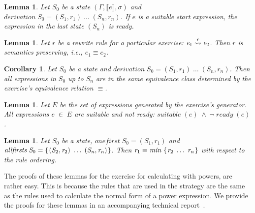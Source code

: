 \documentclass[copyright]{eptcs}
\newcommand{\Conid}[1]{\mathit{#1}}
\newcommand{\Varid}[1]{\mathit{#1}}
\newtheorem{lemma}[thm]{Lemma}
\newtheorem{corollary}[thm]{Corollary}
\begin{document}
\begin{lemma}
  Let \ensuremath{\Conid{S}_{0}} be a state \ensuremath{(\Gamma,{\llbracket\Varid{e}\rrbracket},\sigma)} and \ensuremath{\Varid{derivation}\;\Conid{S}_{0}\mathrel{=}(\Conid{S}_{1},\Varid{r}_{1})\;\ldots\;(\mathit{S_n},\mathit{r_n})}. If \ensuremath{\Varid{e}} is a suitable start expression, the expression in the last
  state \ensuremath{(\mathit{S_n})} is ready.
\end{lemma}
\begin{lemma}
  Let \ensuremath{\Varid{r}} be a rewrite rule for a particular exercise: \ensuremath{\Varid{e}_{1}\;{\buildrel \Varid{r} \over \leadsto}\;\Varid{e}_{2}}. Then \ensuremath{\Varid{r}} 
  is semantics preserving, i.e., \ensuremath{\Varid{e}_{1}\equiv \Varid{e}_{2}}.
\end{lemma}
\begin{corollary}
  Let \ensuremath{\Conid{S}_{0}} be a state and \ensuremath{\Varid{derivation}\;\Conid{S}_{0}\mathrel{=}(\Conid{S}_{1},\Varid{r}_{1})\;\ldots\;(\mathit{S_n},\mathit{r_n})}.  Then all
  expressions in \ensuremath{\Conid{S}_{0}} up to \ensuremath{\mathit{S_n}} are in the same equivalence class determined by
  the exercise's equivalence relation \ensuremath{\equiv }.
\end{corollary}
\begin{lemma}
  Let \ensuremath{\Conid{E}} be the set of expressions generated by the exercise's generator. 
  All expressions \ensuremath{\Varid{e}\;\mathrel{\in}\;\Conid{E}} are suitable and not ready: \ensuremath{\Varid{suitable}\;(\Varid{e})\;\wedge\;\neg\;\Varid{ready}\;(\Varid{e})}.
\end{lemma}
\begin{lemma}
  Let \ensuremath{\Conid{S}_{0}} be a state, \ensuremath{\Varid{onefirst}\;\Conid{S}_{0}\mathrel{=}(\Conid{S}_{1},\Varid{r}_{1})} and \ensuremath{\Varid{allfirsts}\;\Conid{S}_{0}\mathrel{=}\{\mskip1.5mu (\Conid{S}_{2},\Varid{r}_{2})\;\ldots\;(\mathit{S_n},\mathit{r_n})\mskip1.5mu\}}. Then \ensuremath{\Varid{r}_{1}\equiv \Varid{min}\;\{\mskip1.5mu \Varid{r}_{2}\;\ldots\;\mathit{r_n}\mskip1.5mu\}} with respect to the rule
  ordering.
\end{lemma}
The proofs of these lemmas for the exercise for calculating with powers, are
rather easy. This is because the rules that are used in the strategy are the
same as the rules used to calculate the normal form of a power expression. We
provide the proofs for these lemmas in an accompanying technical
report~\cite{UUCS2010028}.
\end{document}
